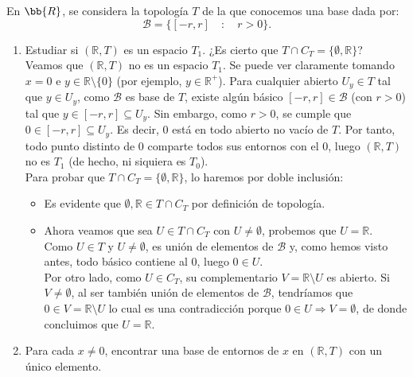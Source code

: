 \documentclass[12pt]{article}
\begin{document}
    \begin{ejercicio}
       En $\bb{R}$, se considera la topología $T$ de la que conocemos una base dada por:
        \[
        \mathcal{B}=\{[-r,r]\quad : \quad r>0\}.
        \]
        \begin{enumerate}
            \item Estudiar si $(\mathbb{R}, T)$ es un espacio $T_1$. ¿Es cierto que $T\cap C_T = \{\emptyset, \mathbb{R}\}$?\\
            Veamos que $(\mathbb{R}, T)$ no es un espacio $T_1$. Se puede ver claramente tomando $x = 0$ e $y \in \mathbb{R} \setminus \{0\}$ (por ejemplo, $y \in \mathbb{R}^+$).
            Para cualquier abierto $U_y \in T$ tal que $y \in U_y$, como $\mathcal{B}$ es base de $T$, existe algún básico $[-r, r] \in \mathcal{B}$ (con $r > 0$) tal que $y \in [-r, r] \subseteq U_y$. 
            Sin embargo, como $r > 0$, se cumple que $0 \in [-r, r] \subseteq U_y$. Es decir, $0$ está en todo abierto no vacío de $T$. Por tanto, todo punto distinto de $0$ comparte todos sus entornos con el $0$, luego $(\mathbb{R}, T)$ no es $T_1$ (de hecho, ni siquiera es $T_0$).\\

            Para probar que $T\cap C_T = \{\emptyset, \mathbb{R}\}$, lo haremos por doble inclusión:
            \begin{itemize}
                \item[$\supseteq$] Es evidente que $\emptyset, \mathbb{R} \in T \cap C_T$ por definición de topología.
                \item[$\subseteq$] Ahora veamos que sea $U \in T \cap C_T$ con $U \neq \emptyset$, probemos que $U = \mathbb{R}$.\\
                Como $U \in T$ y $U \neq \emptyset$, es unión de elementos de $\mathcal{B}$ y, como hemos visto antes, todo básico contiene al $0$, luego $0 \in U$.\\
                Por otro lado, como $U \in C_T$, su complementario $V = \mathbb{R} \setminus U$ es abierto. Si $V \neq \emptyset$, al ser también unión de elementos de $\mathcal{B}$, tendríamos que $0 \in V = \mathbb{R} \setminus U$ lo cual es una contradicción porque $0\in U \Rightarrow V = \emptyset$, de donde concluimos que $U = \mathbb{R}$. 
            \end{itemize}
        \item Para cada $x\neq 0$, encontrar una base de entornos de $x$ en $(\mathbb{R}, T)$ con un único elemento.
        


\end{enumerate}
\end{ejercicio}
\end{document}
